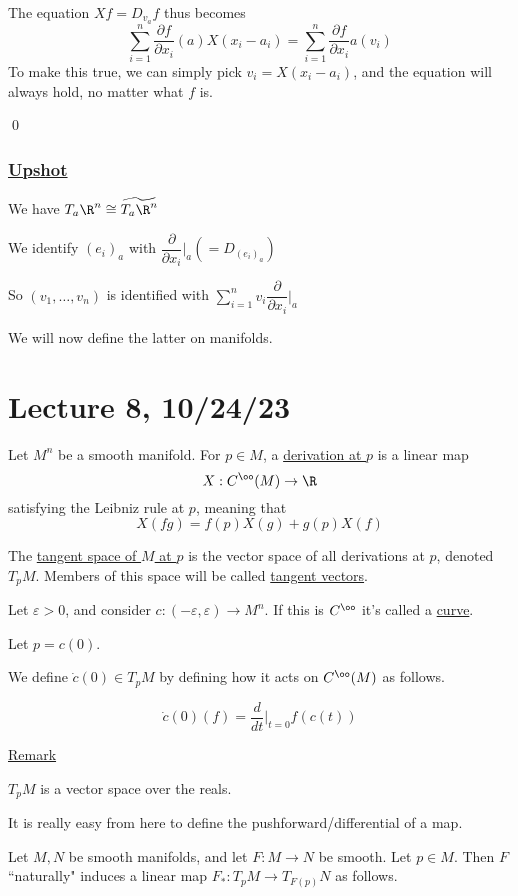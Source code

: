 \documentclass[x11names,reqno,14pt]{extarticle}
\newcommand{\pp}[2]{\dfrac{\partial #1}{\partial #2}}
\begin{document}
The equation $Xf = D_{v_a}f$ thus becomes 
\[
\sum_{i=1}^n\pp{f}{x_i}(a)X(x_i-a_i) = \sum_{i=1}^n\pp{f}{x_i}a(v_i)
\]
To make this true, we can simply pick $v_i = X(x_i - a_i)$, and the equation will always hold, no matter what $f$ is. 

\qed

\subsubsection*{\underline{Upshot}}

We have $T_a\R^n \cong \widetilde{T_a\R^n}$

We identify $(e_i)_a$ with $\pp{}{x_i}|_a (= D_{(e_i)_a})$

So $(v_1, \dots, v_n)$ is identified with $\sum_{i=1}^nv_i\pp{}{x_i}|_a$

We will now define the latter on manifolds. 

\section*{Lecture 8, 10/24/23}


Let $M^n$ be a smooth manifold. For $p\in M$, a \underline{derivation at $p$} is a linear map
\[
X:C^\oo(M)\to\R
\]
satisfying the Leibniz rule at $p$, meaning that
\[
X(fg) = f(p)X(g) + g(p)X(f)
\]


The \underline{tangent space of $M$ at $p$} is the vector space of all derivations at $p$, denoted $T_pM$. Members of this space will be called \underline{tangent vectors}.

\exm

Let $\varepsilon>0$, and consider $c:(-\varepsilon,\varepsilon)\to M^n$. If this is $C^\oo$ it's called a \underline{curve}.

Let $p = c(0)$. 


We define $\dot{c}(0) \in T_pM$ by defining how it acts on $C^\oo(M)$ as follows. 

\[
\dot{c}(0)(f) = \frac{d}{dt}|_{t=0}f(c(t))
\]

\underline{Remark}

$T_pM$ is a vector space over the reals. 


It is really easy from here to define the pushforward/differential of a map. 

Let $M, N$ be smooth manifolds, and let $F:M\to N$ be smooth. Let $p \in M$. Then $F$ ``naturally" induces a linear map $F_*:T_pM\to T_{F(p)}N$ as follows. 
\end{document}
